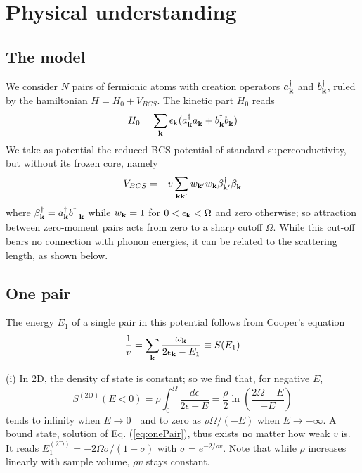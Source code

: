 \documentclass[5p,twocolumn]{elsarticle}
\begin{document}
\section{Physical understanding}
\subsection{The model\label{sec:model}}
We consider $N$ pairs of fermionic atoms with creation operators $a_{\mathbf{k}}^\dagger$ and $b_{\mathbf{k}}^\dagger$, ruled by the hamiltonian
$H=H_{0}+V_{BCS}$. The kinetic part $H_0$ reads 
\begin{equation}
H_0=\sum_{\mathbf{k}}\epsilon_{\mathbf{k}}(a^\dagger_{\mathbf{k}}{}a^{}_{\mathbf{k}}+b^\dagger_{\mathbf{k}}{}b^{}_{\mathbf{k}})
\end{equation}
We take as potential  the reduced BCS potential of standard superconductivity, but without its frozen core, namely
\begin{equation}
V_{BCS}=-v\sum_{\mathbf{k}\mathbf{k}'}w_{\mathbf{k}'}w_{\mathbf{k}}\beta^\dagger_{\mathbf{k}'}{}\beta^{}_{\mathbf{k}}
\label{eq:VBcs}
\end{equation}
 where $\beta^\dagger_{\mathbf{k}}=a^\dagger_{\mathbf{k}}b^\dagger_{-\mathbf{k}}$ while $w_{\mathbf{k}}=1$ for $0<\epsilon_{\mathbf{k}}<\Omega$ and zero otherwise; so attraction between zero-moment pairs acts from zero to a sharp cutoff $\Omega$. While this cut-off bears no connection with phonon energies, it can be related to the scattering length, as shown below.
 \subsection{One pair\label{sec:onePair}}
The energy $E_1$ of a single pair in this potential follows from Cooper's equation
\begin{equation}
\frac{1}{v}=\sum_{\mathbf{k}}\frac{\omega_{\mathbf{k}}}{2\epsilon_{\mathbf{k}}-E_1}\equiv{}S(E_1)
\label{eq:onePair}
\end{equation}

(i) In 2D, the density of state is constant; so we find that, for negative $E$, 
\begin{equation}
S^{(\text{2D})}(E<0)=\rho\int_0^{\Omega}\frac{d\epsilon}{2\epsilon-E}=\frac{\rho}{2}\ln\left(\frac{2\Omega-E}{-E}\right)
\label{eq:s1pair}
\end{equation}
tends to infinity when $E\rightarrow{}0_{-}$ and to zero as $\rho\Omega/(-E)$ when $E\rightarrow-\infty$. A bound state, solution of Eq. (\ref{eq:onePair}), thus exists no matter how weak $v$ is. It reads
$
E_1^{(\text{2D})}=-2\Omega\sigma/(1-\sigma)
$
with $\sigma=e^{-2/\rho{v}}$. Note that while $\rho$ increases linearly with sample volume, $\rho{v}$ stays constant.
\end{document}
